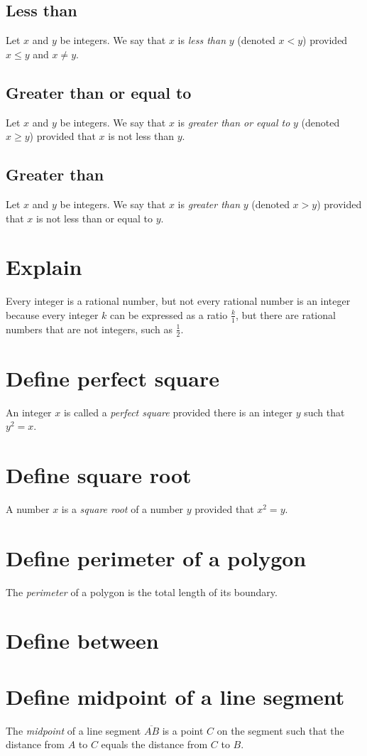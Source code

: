 \documentclass[12pt]{article}
\begin{document}
\subsection{Less than}
Let $x$ and $y$ be integers. We say that $x$ is \textit{less than} $y$ (denoted $x<y$) provided $x\leq y$ and $x\neq y$.
\subsection{Greater than or equal to}
Let $x$ and $y$ be integers. We say that $x$ is \textit{greater than or equal to} $y$ (denoted $x\geq y$) provided that $x$ is not less than $y$.
\subsection{Greater than}
Let $x$ and $y$ be integers. We say that $x$ is \textit{greater than} $y$ (denoted $x>y$) provided that $x$ is not less than or equal to $y$.
\section{Explain}
Every integer is a rational number, but not every rational number is an integer because every integer $k$ can be expressed as a ratio $\frac{k}{1}$, but there are rational numbers that are not integers, such as $\frac{1}{2}.$
\section{Define perfect square}
An integer $x$ is called a \textit{perfect square} provided there is an integer $y$ such that $y^2=x$.
\section{Define square root}
A number $x$ is a \textit{square root} of a number $y$ provided that $x^2=y$.
\section{Define perimeter of a polygon}
The \textit{perimeter} of a polygon is the total length of its boundary.
\section{Define between}
\section{Define midpoint of a line segment}
The \textit{midpoint} of a line segment $\overline{AB}$ is a point $C$ on the segment such that the distance from $A$ to $C$ equals the distance from $C$ to $B$.
\end{document}
